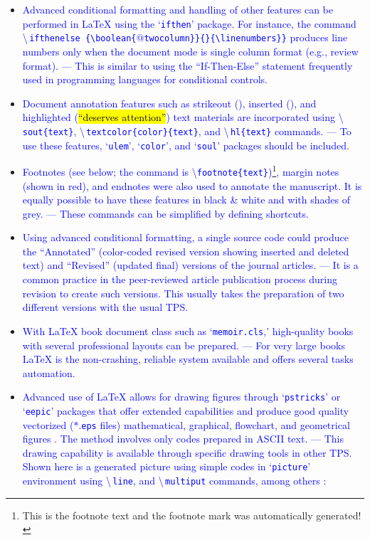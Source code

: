 \documentclass[phd,showframe]{ndsu-thesis-2022}
\newcommand\italk[1]{\textcolor{blue}{#1}}  %
\newcommand\cmd[1]{\textbackslash\texttt{#1}}  %
\newcommand\lx{\LaTeX\xspace}
\newcommand\vb[1]{\textcolor{blue}{\texttt{#1}}}%
\newcommand\vbc[1]{\textcolor{blue}{\textbackslash\,\texttt{#1}}}%
\begin{document}
\begin{itemize}[leftmargin=*, itemsep=0pt, parsep=3pt]
\item \italk{Advanced conditional formatting and handling of other features can be performed in \lx using the `\vb{ifthen}' \cptp package. For instance, the command} \vbc{ifthenelse
\{\textbackslash boolean\{$@$twocolumn\}\}\{\}\{\textbackslash linenumbers\}\}} \italk{produces line numbers only when the document mode is single column format (e.g., review format). --- This is similar to using the ``If-Then-Else'' statement frequently used in programming languages for conditional controls.}   

\item \italk{Document annotation features such as strikeout (\dt{``deleted text''}), inserted (\nt{``newly added''}), and highlighted (\hl{``deserves attention''}) text materials are incorporated using \vbc{sout\{text\}}, \vbc{textcolor\{color\}\{text\}}, and \vbc{hl\{text\}} commands. --- To use these features, `\vb{ulem}', `\vb{color}', and `\vb{soul}' packages should be included.} 

\item \italk{Footnotes (see below; the command is \cmd{footnote\{text\}})\footnote{This is the footnote text and the footnote mark was automatically generated!}, margin notes {\marginpar{\scriptsize\textcolor{red}{This is a margin note shown in color.}}} (shown in red), and endnotes were also used to annotate the manuscript. It is equally possible to have these features in black \& white and with shades of grey. --- These commands can be simplified by defining shortcuts.} 

\item \italk{Using advanced conditional formatting, a single source code could produce the ``Annotated'' (color-coded revised version showing inserted and deleted text) and ``Revised'' (updated final) versions of the journal articles. --- It is a common practice in the peer-reviewed article publication process during revision to create such versions. This usually takes the preparation of two different versions with the usual TPS.}  

\item \italk{With \lx book document class such as `\vb{memoir.cls},' high-quality books with several professional layouts can be prepared. --- For very large books \lx is the non-crashing, reliable system available and offers several tasks automation.}   

\item \italk{Advanced use of \lx allows for drawing figures through `\vb{pstricks}' or `\vb{eepic}' packages that offer extended capabilities and produce good quality vectorized ($\ast$.\vb{eps} files) mathematical, graphical, flowchart, and geometrical figures \citep{Goossens2008g}. The method involves only codes prepared in ASCII text. --- This drawing capability is available through specific drawing tools in other TPS. Shown here is a generated picture using simple codes in `\vb{picture}' environment using \vbc{line}, and \vbc{multiput} commands, among others \citep{Kern2007a, Kern2007, Mittelbach2004}:}   


\end{itemize}
\end{document}
